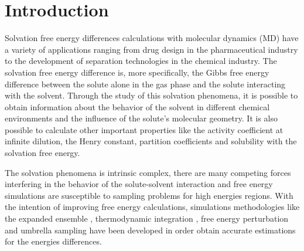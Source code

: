 \chapter{Introduction} %

\label{Chapter1} %

Solvation free energy differences calculations with molecular dynamics (MD) have a variety of applications ranging from drug design in the pharmaceutical industry  to the development of separation technologies in the chemical industry. The solvation free energy difference is, more specifically, the Gibbs free energy difference between the solute alone in the gas phase and the solute interacting with the solvent. Through the study of this solvation phenomena, it is possible to obtain  information about the behavior of the solvent in different chemical environments and the influence of the solute's molecular geometry. It is also possible to calculate other important properties like the activity coefficient at infinite dilution, the Henry constant, partition coefficients and solubility with the solvation free energy. 

The solvation phenomena is intrinsic complex, there are many competing forces interfering in the behavior of the solute-solvent interaction and free energy simulations are susceptible to sampling problems for high energies regions. With the intention of improving free energy calculations, simulations methodologies like the expanded ensemble \cite{lyubartsev}, thermodynamic integration \cite{kirkwood1935}, free energy perturbation \cite{zwanzig1954,bennet1976,mbar} and umbrella sampling \cite{TORRIE1977187} have been developed in order obtain accurate estimations for the energies differences. 

